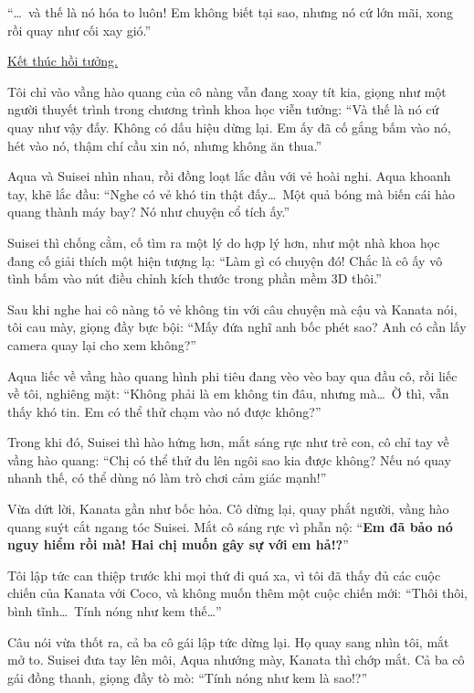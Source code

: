 \documentclass[../main.tex]{subfiles}
\begin{document}
``\dots\ và thế là nó hóa to luôn! Em không biết tại sao, nhưng nó cứ lớn mãi, xong rồi quay như cối xay gió.''

\begin{center}
  \uline{Kết thúc hồi tưởng.}
\end{center}

Tôi chỉ vào vầng hào quang của cô nàng vẫn đang xoay tít kia, giọng như một người thuyết trình trong chương trình khoa học viễn tưởng: ``Và thế là nó cứ quay như vậy đấy. Không có dấu hiệu dừng lại. Em ấy đã cố gắng bấm vào nó, hét vào nó, thậm chí cầu xin nó, nhưng không ăn thua.''

Aqua và Suisei nhìn nhau, rồi đồng loạt lắc đầu với vẻ hoài nghi. Aqua khoanh tay, khẽ lắc đầu: ``Nghe có vẻ khó tin thật đấy\dots\ Một quả bóng mà biến cái hào quang thành máy bay? Nó như chuyện cổ tích ấy.''

Suisei thì chống cằm, cố tìm ra một lý do hợp lý hơn, như một nhà khoa học đang cố giải thích một hiện tượng lạ: ``Làm gì có chuyện đó! Chắc là cô ấy vô tình bấm vào nút điều chỉnh kích thước trong phần mềm 3D thôi.''

Sau khi nghe hai cô nàng tỏ vẻ không tin với câu chuyện mà cậu và Kanata nói, tôi cau mày, giọng đầy bực bội: ``Mấy đứa nghĩ anh bốc phét sao? Anh có cần lấy camera quay lại cho xem không?''

Aqua liếc về vầng hào quang hình phi tiêu đang vèo vèo bay qua đầu cô, rồi liếc về tôi, nghiêng mặt: ``Không phải là em không tin đâu, nhưng mà\dots\ Ờ thì, vẫn thấy khó tin. Em có thể thử chạm vào nó được không?''

Trong khi đó, Suisei thì hào hứng hơn, mắt sáng rực như trẻ con, cô chỉ tay về vầng hào quang: ``Chị có thể thử đu lên ngôi sao kia được không? Nếu nó quay nhanh thế, có thể dùng nó làm trò chơi cảm giác mạnh!''

Vừa dứt lời, Kanata gần như bốc hỏa. Cô dừng lại, quay phắt người, vầng hào quang suýt cắt ngang tóc Suisei. Mắt cô sáng rực vì phẫn nộ: ``\textbf{Em đã bảo nó nguy hiểm rồi mà! Hai chị muốn gây sự với em hả!?}''

Tôi lập tức can thiệp trước khi mọi thứ đi quá xa, vì tôi đã thấy đủ các cuộc chiến của Kanata với Coco, và không muốn thêm một cuộc chiến mới: ``Thôi thôi, bình tĩnh\dots\ Tính nóng như kem thế\dots''

Câu nói vừa thốt ra, cả ba cô gái lập tức dừng lại. Họ quay sang nhìn tôi, mắt mở to. Suisei đưa tay lên môi, Aqua nhướng mày, Kanata thì chớp mắt. Cả ba cô gái đồng thanh, giọng đầy tò mò: ``Tính nóng như kem là sao!?''
\end{document}
